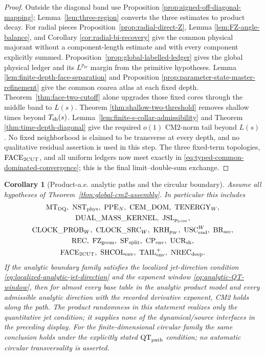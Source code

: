 \documentclass[11pt]{article}
\newtheorem{corollary}[theorem]{Corollary}
\begin{document}
\begin{proof}
Outside the diagonal band use Proposition
\ref{prop:signed-off-diagonal-mapping};
Lemma~\ref{lem:three-region} converts the three estimates to product decay.
For radial pieces Proposition~\ref{prop:radial-direct-Z}, Lemma
\ref{lem:FZ-angle-balance}, and Corollary
\ref{cor:radial-bi-recovery} give the common physical majorant without a
component-length estimate and with every component explicitly summed.
Proposition~\ref{prop:global-labelled-ledger} gives the global physical
ledger and its $L^{p_W}$ margin from the primitive hypotheses.  Lemma
\ref{lem:finite-depth-face-separation} and Proposition
\ref{prop:parameter-state-master-refinement} give the common coarea atlas at
each fixed depth.  Theorem~\ref{thm:face-two-cutoff} alone upgrades those
fixed cores through the middle band to $L(s)$.  Theorem
\ref{thm:shallow-two-threshold} removes shallow times beyond
$T_{\rm sh}(s)$.  Lemma~\ref{lem:finite-s-collar-admissibility} and Theorem
\ref{thm:time-depth-diagonal} give the required $o(1)$ CM2-norm tail beyond
$L(s)$.  No fixed neighborhood is
claimed to be transverse at every depth, and no qualitative residual
assertion is used in this step.  The three fixed-term topologies,
$\mathrm{FACE}_{\rm 2CUT}$, and all uniform ledgers now meet exactly in
\eqref{eq:typed-common-dominated-convergence}; this is the final
limit--double-sum exchange.
\end{proof}

\begin{corollary}[Product-a.e. analytic paths and the circular boundary]
\label{cor:analytic-pathwise-CM2}
Assume all hypotheses of Theorem~\ref{thm:global-cm2-assembly}.  In
particular this includes
\[
\begin{gathered}
 \mathrm{MT}_{\rm DQ},\ \mathrm{NST}_{\rm phys},\ \mathrm{PPE}_{N},\
 \mathrm{CEM\_DOM},\ \mathrm{TENERGY}_{W},\\
 \mathrm{DUAL\_MASS\_KERNEL},\ \mathrm{JSL}_{p_{\rm joint}},\\
 \mathrm{CLOCK\_PROB}_{W},\ \mathrm{CLOCK\_SRC}_{W},\
 \mathrm{KRH}_{p_W},\ \mathrm{USC}_{\rm end}^{W},\ \mathrm{BR}_{\rm sec},\\
 \mathrm{REC},\ \mathrm{FZ}_{\rm geom},\ \mathrm{SF}_{\rm split},\
 \mathrm{CP}_{\rm env},\ \mathrm{UCR}_{\rm sh},\\
 \mathrm{FACE}_{\rm 2CUT},\ \mathrm{SHCOL}_{\rm env},\
 \mathrm{TAIL}_{\rm env}^{+},\ \mathrm{NREC}_{\rm deep}.
\end{gathered}
\]
If the analytic boundary family
satisfies the localized jet-direction condition
\eqref{eq:localized-analytic-jet-direction} and the exponent window
\eqref{eq:analytic-QT-window}, then for almost every base table in the
analytic product model and every admissible analytic direction with the
recorded derivative exponent, CM2 holds along the path.
The product randomness in this statement realizes only the quantitative jet
condition; it supplies none of the dynamical/source interfaces in the
preceding display.
For the finite-dimensional circular family the same conclusion holds under
the explicitly stated $\mathrm{QT}_{\rm path}$ condition; no automatic
circular transversality is asserted.
\end{corollary}
\end{document}
